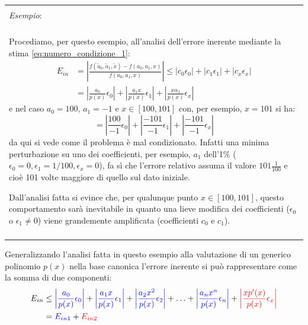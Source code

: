 \documentclass{article}
\numberwithin{equation}{section}
\newenvironment{example}
{\begin{center}
        \begin{tabular}{|p{0.9\textwidth}|}
            \hline \\ 
            \textit{Esempio}: \\\\ 
        }
        {
            \\\\ \hline
        \end{tabular}
    \end{center}
}
\begin{document}
\begin{example}
    \vskip 0.1in 
    Procediamo, per questo esempio, all'analisi dell'errore inerente mediante
    la stima \ref{eq:numero_condizione_1}:
    \begin{equation*}
       \begin{aligned}
            E_{in} &= \left\lvert \frac{f(\tilde{a}_0, \tilde{a}_1,
            \tilde{x})-f(a_0,a_1,x)}{f(a_0,a_1,x)}\right\rvert \leq
            \left\lvert c_0\epsilon_0\right\rvert + 
            \left\lvert c_1\epsilon_1\right\rvert + 
            \left\lvert c_x\epsilon_x\right\rvert\\ 
            &= \left\lvert \frac{a_0}{p(x)}\epsilon_0\right\rvert +
            \left\lvert \frac{a_1x}{p(x)}\epsilon_1\right\rvert +
            \left\lvert \frac{x\alpha_1}{p(x)}\epsilon_x\right\rvert
       \end{aligned} 
    \end{equation*}
    e nel caso $a_0=100$, $a_1=-1$ e $x\in[100,101]$ con, per esempio, $x=101$
    si ha:
    $$=\left\lvert \frac{100}{-1}\epsilon_0\right\rvert + \left\lvert
    \frac{-101}{-1}\epsilon_1\right\rvert +
    \left\lvert \frac{-101}{-1}\epsilon_x\right\rvert$$
    da qui si vede come il problema è mal condizionato. Infatti una minima 
    perturbazione su uno dei coefficienti, per esempio, 
    $a_1$ dell'1\% ($\epsilon_0=0,\epsilon_1=1/100,\epsilon_x=0$),
    fa sì che l'errore relativo assuma il valore $101 \frac{1}{100}$ e cioè
    101 volte maggiore di quello sul dato iniziale.

    Dall'analisi fatta si evince che, per qualunque punto $x\in[100,101]$,
    questo comportamento sarà inevitabile in quanto una lieve modifica dei
    coefficienti ($\epsilon_0$ o $\epsilon_1\neq 0$) viene grandemente
    amplificata (coefficienti $c_0\text{ e }c_1$).
\end{example}
Generalizzando l'analisi fatta in questo esempio alla valutazione di un
generico polinomio $p(x)$ nella base canonica l'errore inerente si può
rappresentare come la somma di due componenti:
\begin{equation*}
    \begin{aligned}
        E_{in} &\leq 
        {\color{blue}\left\lvert \frac{a_0}{p(x)}\epsilon_0\right\rvert} + 
        {\color{blue}\left\lvert \frac{a_1x}{p(x)}\epsilon_1\right\rvert} + 
        {\color{blue}\left\lvert \frac{a_2x^2}{p(x)}\epsilon_2\right\rvert} + \ldots + 
        {\color{blue}\left\lvert \frac{a_nx^n}{p(x)}\epsilon_n\right\rvert} + 
        {\color{red}\left\lvert \frac{xp'(x)}{p(x)}\epsilon_x \right\rvert}\\
        &={\color{blue}E_{in1}}+{\color{red}E_{in2}}
    \end{aligned}
\end{equation*}
\end{document}
